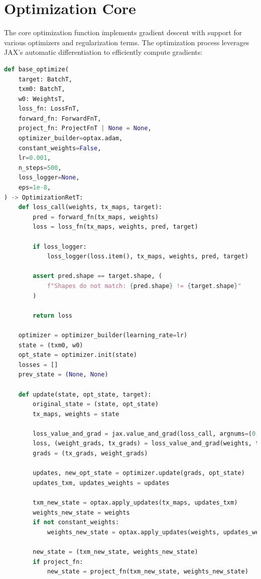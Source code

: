\documentclass[nomenclature, english, bibtex]{kththesis}
\numberwithin{listing}{chapter}
\begin{document}
\section{Optimization Core}
The core optimization function implements gradient descent with support for various optimizers and regularization terms. The optimization process leverages JAX's automatic differentiation to efficiently compute gradients:

\begin{lstlisting}[language=Python, caption=Base optimization function]
def base_optimize(
    target: BatchT,
    txm0: BatchT,
    w0: WeightsT,
    loss_fn: LossFnT,
    forward_fn: ForwardFnT,
    project_fn: ProjectFnT | None = None,
    optimizer_builder=optax.adam,
    constant_weights=False,
    lr=0.001,
    n_steps=500,
    loss_logger=None,
    eps=1e-8,
) -> OptimizationRetT:
    def loss_call(weights, tx_maps, target):
        pred = forward_fn(tx_maps, weights)
        loss = loss_fn(tx_maps, weights, pred, target)

        if loss_logger:
            loss_logger(loss.item(), tx_maps, weights, pred, target)

        assert pred.shape == target.shape, (
            f"Shapes do not match: {pred.shape} != {target.shape}"
        )

        return loss

    optimizer = optimizer_builder(learning_rate=lr)
    state = (txm0, w0)
    opt_state = optimizer.init(state)
    losses = []
    prev_state = (None, None)

    def update(state, opt_state, target):
        original_state = (state, opt_state)
        tx_maps, weights = state

        loss_value_and_grad = jax.value_and_grad(loss_call, argnums=(0, 1))
        loss, (weight_grads, tx_grads) = loss_value_and_grad(weights, tx_maps, target)
        grads = (tx_grads, weight_grads)

        updates, new_opt_state = optimizer.update(grads, opt_state)
        updates_txm, updates_weights = updates

        txm_new_state = optax.apply_updates(tx_maps, updates_txm)
        weights_new_state = weights
        if not constant_weights:
            weights_new_state = optax.apply_updates(weights, updates_weights)

        new_state = (txm_new_state, weights_new_state)
        if project_fn:
            new_state = project_fn(txm_new_state, weights_new_state)


\end{lstlisting}
\end{document}
